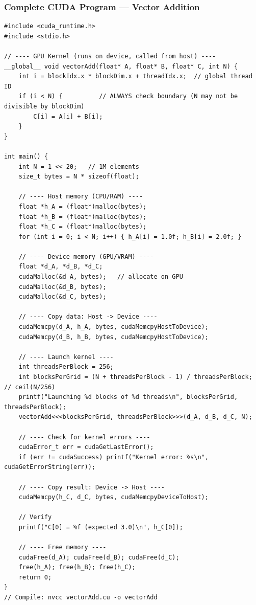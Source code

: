 \documentclass[11pt,a4paper]{article}
\begin{document}
\subsubsection{Complete CUDA Program --- Vector Addition}

\begin{lstlisting}
#include <cuda_runtime.h>
#include <stdio.h>

// ---- GPU Kernel (runs on device, called from host) ----
__global__ void vectorAdd(float* A, float* B, float* C, int N) {
    int i = blockIdx.x * blockDim.x + threadIdx.x;  // global thread ID
    if (i < N) {          // ALWAYS check boundary (N may not be divisible by blockDim)
        C[i] = A[i] + B[i];
    }
}

int main() {
    int N = 1 << 20;   // 1M elements
    size_t bytes = N * sizeof(float);

    // ---- Host memory (CPU/RAM) ----
    float *h_A = (float*)malloc(bytes);
    float *h_B = (float*)malloc(bytes);
    float *h_C = (float*)malloc(bytes);
    for (int i = 0; i < N; i++) { h_A[i] = 1.0f; h_B[i] = 2.0f; }

    // ---- Device memory (GPU/VRAM) ----
    float *d_A, *d_B, *d_C;
    cudaMalloc(&d_A, bytes);   // allocate on GPU
    cudaMalloc(&d_B, bytes);
    cudaMalloc(&d_C, bytes);

    // ---- Copy data: Host -> Device ----
    cudaMemcpy(d_A, h_A, bytes, cudaMemcpyHostToDevice);
    cudaMemcpy(d_B, h_B, bytes, cudaMemcpyHostToDevice);

    // ---- Launch kernel ----
    int threadsPerBlock = 256;
    int blocksPerGrid = (N + threadsPerBlock - 1) / threadsPerBlock; // ceil(N/256)
    printf("Launching %d blocks of %d threads\n", blocksPerGrid, threadsPerBlock);
    vectorAdd<<<blocksPerGrid, threadsPerBlock>>>(d_A, d_B, d_C, N);

    // ---- Check for kernel errors ----
    cudaError_t err = cudaGetLastError();
    if (err != cudaSuccess) printf("Kernel error: %s\n", cudaGetErrorString(err));

    // ---- Copy result: Device -> Host ----
    cudaMemcpy(h_C, d_C, bytes, cudaMemcpyDeviceToHost);

    // Verify
    printf("C[0] = %f (expected 3.0)\n", h_C[0]);

    // ---- Free memory ----
    cudaFree(d_A); cudaFree(d_B); cudaFree(d_C);
    free(h_A); free(h_B); free(h_C);
    return 0;
}
// Compile: nvcc vectorAdd.cu -o vectorAdd
\end{lstlisting}
\end{document}
